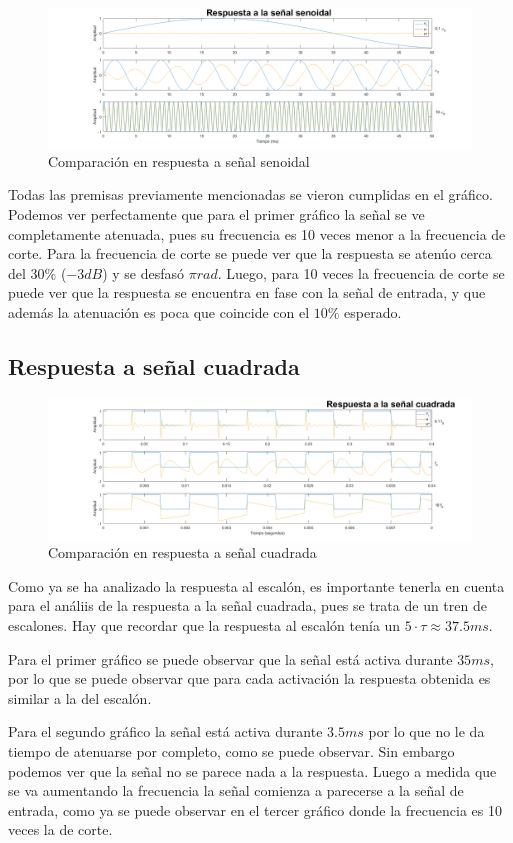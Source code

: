 \begin{figure}[H]
    \centering
    \includegraphics[width=1\textwidth]{resources/Comparacion_Seno.png}
    \caption{Comparación en respuesta a señal senoidal}
\end{figure}

Todas las premisas previamente mencionadas se vieron cumplidas en el gráfico. Podemos ver perfectamente que para el primer gráfico la señal se ve completamente atenuada, pues su frecuencia es 10 veces menor a la frecuencia de corte. Para la frecuencia de corte se puede ver que la respuesta se atenúo cerca del $30\%$ ($-3dB$) y se desfasó $\pi rad$. Luego, para 10 veces la frecuencia de corte se puede ver que la respuesta se encuentra en fase con la señal de entrada, y que además la atenuación es poca que coincide con el $10\%$ esperado.

\subsection{Respuesta a señal cuadrada}
\begin{figure}[H]
    \centering
    \includegraphics[width=1\textwidth]{resources/Comparacion_Cuadrada.png}
    \caption{Comparación en respuesta a señal cuadrada}
\end{figure}

Como ya se ha analizado la respuesta al escalón, es importante tenerla en cuenta para el análiis de la respuesta a la señal cuadrada, pues se trata de un tren de escalones. Hay que recordar que la respuesta al escalón tenía un $5 \cdot \tau \approx 37.5ms$.

Para el primer gráfico se puede observar que la señal está activa durante $35ms$, por lo que se puede observar que para cada activación la respuesta obtenida es similar a la del escalón.

Para el segundo gráfico la señal está activa durante $3.5ms$ por lo que no le da tiempo de atenuarse por completo, como se puede observar. Sin embargo podemos ver que la señal no se parece nada a la respuesta. Luego a medida que se va aumentando la frecuencia la señal comienza a parecerse a la señal de entrada, como ya se puede observar en el tercer gráfico donde la frecuencia es 10 veces la de corte.